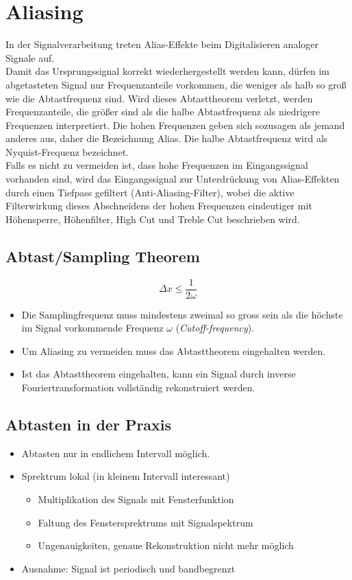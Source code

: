 \section{Aliasing}
In der Signalverarbeitung treten Alias-Effekte beim Digitalisieren analoger Signale auf. \\
Damit das Ursprungssignal korrekt wiederhergestellt werden kann, dürfen im abgetasteten Signal nur Frequenzanteile vorkommen, die weniger als halb so groß wie die Abtastfrequenz sind. Wird dieses Abtasttheorem verletzt, werden Frequenzanteile, die größer sind als die halbe Abtastfrequenz als niedrigere Frequenzen interpretiert. Die hohen Frequenzen geben sich sozusagen als jemand anderes aus, daher die Bezeichnung Alias. Die halbe Abtastfrequenz wird als Nyquist-Frequenz bezeichnet. \\
Falls es nicht zu vermeiden ist, dass hohe Frequenzen im Eingangssignal vorhanden sind, wird das Eingangssignal zur Unterdrückung von Alias-Effekten durch einen Tiefpass gefiltert (Anti-Aliasing-Filter), wobei die aktive Filterwirkung dieses Abschneidens der hohen Frequenzen eindeutiger mit Höhensperre, Höhenfilter, High Cut und Treble Cut beschrieben wird.

\subsection{Abtast/Sampling Theorem}
$$\Delta x \leq \frac{1}{2 \omega}$$
\begin{itemize}
\item Die Samplingfrequenz muss mindestens zweimal so gross sein als die höchste im Signal vorkommende Frequenz $\omega$ (\textsl{Cutoff-frequency}).
\item Um Aliasing zu vermeiden muss das Abtasttheorem eingehalten werden.
\item Ist das Abtasttheorem eingehalten, kann ein Signal durch inverse Fouriertransformation vollständig rekonstruiert werden.
\end{itemize}

\subsection{Abtasten in der Praxis}
\begin{itemize}
\item Abtasten nur in endlichem Intervall möglich.
\item Sprektrum lokal (in kleinem Intervall interessant)
\begin{itemize}
\item Multiplikation des Signals mit Fensterfunktion
\item Faltung des Fenstersprektrums mit Signalspektrum
\item Ungenauigkeiten, genaue Rekonstruktion nicht mehr möglich
\end{itemize}
\item Ausnahme: Signal ist periodisch und bandbegrenzt
\end{itemize}

